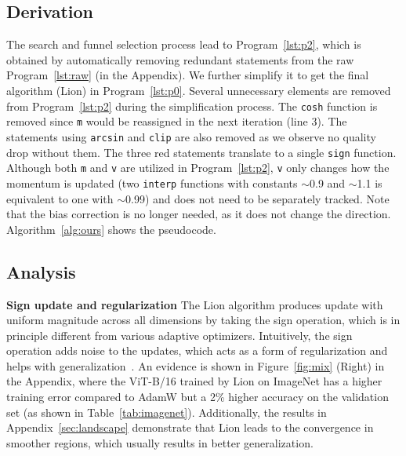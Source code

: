 \documentclass{article}
\newcommand{\name}{Lion}
\begin{document}
\subsection{Derivation}
The search and funnel selection process lead to Program~\ref{lst:p2}, which is obtained by automatically removing redundant statements from the raw Program~\ref{lst:raw} (in the Appendix). 
We further simplify it to get the final algorithm (\name{}) in Program~\ref{lst:p0}.
Several unnecessary elements are removed from Program~\ref{lst:p2} during the simplification process.
The \texttt{cosh} function is removed since \texttt{m} would be reassigned in the next iteration (line 3).
The statements using \texttt{arcsin} and \texttt{clip} are also removed as we observe no quality drop without them. The three {\color{RedOrange} red} statements translate to a single \texttt{sign} function.
Although both \texttt{m} and \texttt{v} are utilized in Program~\ref{lst:p2}, \texttt{v} only changes how the momentum is updated (two \texttt{interp} functions with constants $\sim$0.9 and $\sim$1.1 is equivalent to one with $\sim$0.99) and does not need to be separately tracked.
Note that the bias correction is no longer needed, as it does not change the direction.
Algorithm~\ref{alg:ours} shows the pseudocode. 



\subsection{Analysis}
\label{sec:lion_analysis}

\textbf{Sign update and regularization} 
The \name{} algorithm produces update with uniform magnitude across all dimensions by taking the sign operation, which is in principle different from various adaptive optimizers.
Intuitively, the sign operation adds noise to the updates, which acts as a form of regularization and helps with generalization~\citep{neelakantan2017adding, foret2021sam, chen2022vit-sam}.
An evidence is shown in Figure~\ref{fig:mix} (Right) in the Appendix, where the ViT-B/16 trained by \name{} on ImageNet has a higher training error compared to AdamW but a 2\% higher accuracy on the validation set (as shown in Table~\ref{tab:imagenet}). Additionally, the results in Appendix~\ref{sec:landscape} demonstrate that \name{} leads to the convergence in smoother regions, which usually results in better generalization.
\end{document}
